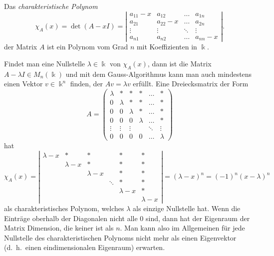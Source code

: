 \begin{definition}
Das {\em charakteristische Polynom}
\[
\chi_A(x)
=
\det (A-x I)
=
\left|
\begin{matrix}
a_{11}-x & a_{12}   & \dots  & a_{1n} \\
a_{21}   & a_{22}-x & \dots  & a_{2n} \\
\vdots   &\vdots    &\ddots  & \vdots \\
a_{n1}   & a_{n2}   &\dots   & a_{nn}-x
\end{matrix}
\right|.
\]
der Matrix $A$ ist ein Polynom vom Grad $n$ mit Koeffizienten in $\Bbbk$.
%
%
\end{definition}

Findet man eine Nullstelle $\lambda\in\Bbbk$ von $\chi_A(x)$,
dann ist die Matrix $A-\lambda I\in M_n(\Bbbk)$ und mit dem Gauss-Algorithmus
kann man auch mindestens einen Vektor $v\in \Bbbk^n$ finden,
der $Av=\lambda v$ erfüllt.
Eine Dreiecksmatrix der Form 
\[
A=\begin{pmatrix}
\lambda&   *   &   *   &   *   &\dots &*\\
   0   &\lambda&   *   &   *   &\dots &*\\
   0   &   0   &\lambda&   *   &\dots &*\\
   0   &   0   &   0   &\lambda&\dots &*\\
\vdots &\vdots &\vdots &       &\ddots&\vdots\\
   0   &   0   &   0   &   0   &\dots &\lambda
\end{pmatrix}
\]
hat
\[
\chi_A(x)
=
\left|
\begin{matrix}
\lambda-x &     *     &     *     &      &    *    &     *   \\
          & \lambda-x &     *     &      &    *    &     *   \\
          &           & \lambda-x &      &    *    &     *   \\
          &           &           &\ddots&    *    &     *   \\
          &           &           &      &\lambda-x&     *   \\
          &           &           &      &         &\lambda-x
\end{matrix}
\right|
=
(\lambda-x)^n
=
(-1)^n (x-\lambda)^n
\]
als charakteristisches Polynom, welches $\lambda$ als einzige
Nullstelle hat.
Wenn die Einträge oberhalb der Diagonalen nicht alle 0 sind,
dann hat der Eigenraum der Matrix Dimension, die keiner ist als
$n$.
Man kann also im Allgemeinen für jede Nullstelle des charakteristischen
Polynoms nicht mehr als einen Eigenvektor (d.~h.~einen eindimensionalen
Eigenraum) erwarten.


